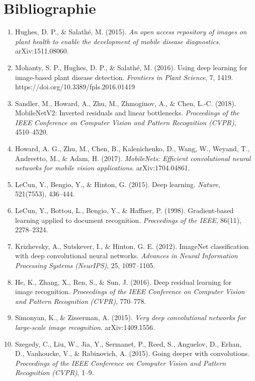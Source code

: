 \documentclass[10pt,a4paper]{article}
\begin{document}
\clearpage

\section*{Bibliographie}

\begin{enumerate}
\item Hughes, D. P., \& Salathé, M. (2015). \emph{An open access repository of images on plant health to enable the development of mobile disease diagnostics}. arXiv:1511.08060.
\item Mohanty, S. P., Hughes, D. P., \& Salathé, M. (2016). Using deep learning for image-based plant disease detection. \emph{Frontiers in Plant Science}, 7, 1419. https://doi.org/10.3389/fpls.2016.01419
\item Sandler, M., Howard, A., Zhu, M., Zhmoginov, A., \& Chen, L.-C. (2018). MobileNetV2: Inverted residuals and linear bottlenecks. \emph{Proceedings of the IEEE Conference on Computer Vision and Pattern Recognition (CVPR)}, 4510--4520.
\item Howard, A. G., Zhu, M., Chen, B., Kalenichenko, D., Wang, W., Weyand, T., Andreetto, M., \& Adam, H. (2017). \emph{MobileNets: Efficient convolutional neural networks for mobile vision applications}. arXiv:1704.04861.
\item LeCun, Y., Bengio, Y., \& Hinton, G. (2015). Deep learning. \emph{Nature}, 521(7553), 436--444.
\item LeCun, Y., Bottou, L., Bengio, Y., \& Haffner, P. (1998). Gradient-based learning applied to document recognition. \emph{Proceedings of the IEEE}, 86(11), 2278--2324.
\item Krizhevsky, A., Sutskever, I., \& Hinton, G. E. (2012). ImageNet classification with deep convolutional neural networks. \emph{Advances in Neural Information Processing Systems (NeurIPS)}, 25, 1097--1105.
\item He, K., Zhang, X., Ren, S., \& Sun, J. (2016). Deep residual learning for image recognition. \emph{Proceedings of the IEEE Conference on Computer Vision and Pattern Recognition (CVPR)}, 770--778.
\item Simonyan, K., \& Zisserman, A. (2015). \emph{Very deep convolutional networks for large-scale image recognition}. arXiv:1409.1556.
\item Szegedy, C., Liu, W., Jia, Y., Sermanet, P., Reed, S., Anguelov, D., Erhan, D., Vanhoucke, V., \& Rabinovich, A. (2015). Going deeper with convolutions. \emph{Proceedings of the IEEE Conference on Computer Vision and Pattern Recognition (CVPR)}, 1--9.

\end{enumerate}
\end{document}
